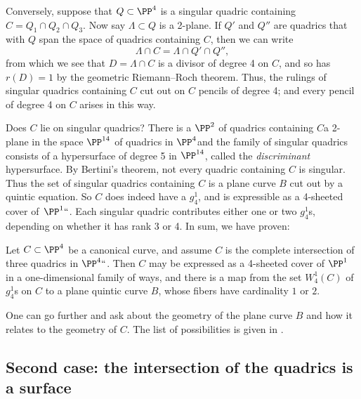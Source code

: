Conversely, suppose that $Q \subset \PP^4$ is a
singular quadric
%
containing $C = Q_1 \cap Q_2 \cap Q_3$. Now say $\Lambda \subset Q$ is
a 2-plane. If $Q'$ and $Q''$ are quadrics that with $Q$ span the
space of quadrics containing $C$, then we can write
$$
\Lambda \cap C = \Lambda \cap Q' \cap Q'',
$$
from which we see that $D = \Lambda \cap C$ is a divisor of degree 4
on $C$, and so has $r(D) = 1$ by the geometric Riemann--Roch theorem.
%
Thus, the rulings of  singular quadrics containing $C$ cut out on $C$
pencils of degree 4; and every pencil of degree 4 on $C$ arises in
this way.

Does $C$ lie on singular quadrics? There is a $\PP^2$ of quadrics
containing $C$\emdash a 2-plane in the space $\PP^{14}$ of quadrics in
$\PP^4$\emdash and the family of singular quadrics  consists of a
hypersurface of degree 5
%
in $\PP^{14}$, called the
\emph{discriminant}
%
%
hypersurface. By
Bertini's theorem,
not every quadric containing $C$
is singular. Thus the set of singular quadrics containing $C$ is a
plane curve $B$ cut out by a
quintic equation.
%
So $C$ does indeed have
a $g^1_4$, and is expressible as a
%
4-sheeted cover of~$\PP^1` `$.
Each singular quadric contributes either
one or two
$g^1_4$s, depending on
whether it has rank 3 or 4. In sum, we have proven:

\begin{proposition}
Let $C \subset \PP^4$ be a canonical curve, and assume $C$ is the
complete intersection of three quadrics
%
in $\PP^4` `$. Then $C$ may be
expressed as a 4-sheeted cover of $\PP^1$ in a one-dimensional family
of ways, and there is a map from the set
$W^1_4(C)$
%
of $g^1_4$s on $C$
to a plane quintic curve $B$, whose fibers have cardinality $1$ or $2$.
\unif
\end{proposition}

One can go further and ask about the geometry of the plane curve $B$
and how it relates to the geometry of $C$. The list of possibilities
is given in \cite[p.~274]{ACGH}.

\subsection*{Second case: the intersection of the quadrics is a surface}
\label{trigonal genus 5} %


